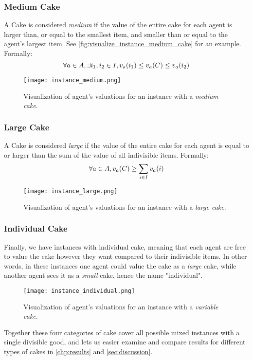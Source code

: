 \subsubsection*{Medium Cake}\label{subsubsec:medium-cake}
A Cake is considered \textit{medium} if the value of the entire cake for each agent is larger than, or equal to the smallest item, and smaller than or equal to the agent's largest item. See \autoref{fig:visualize_instance_medium_cake} for an example. Formally:
$$\forall a\in A, \exists i_1,i_2\in I, v_a(i_1)\leq v_a(C)\leq v_a(i_2)$$
\begin{figure}
    \centering
    \texttt{[image: instance\_medium.png]}
    \caption{Visualization of agent's valuations for an instance with a \textit{medium cake}.}
    \label{fig:visualize_instance_medium_cake}
\end{figure}

\subsubsection*{Large Cake}\label{subsubsec:large-cake}
A Cake is considered \textit{large} if the value of the entire cake for each agent is equal to or larger than the sum of the value of all indivisible items. Formally: 
$$\forall a\in A, v_a(C)\geq \sum_{i\in I}v_a(i)$$
\begin{figure}
    \centering
    \texttt{[image: instance\_large.png]}
    \caption{Visualization of agent's valuations for an instance with a \textit{large cake}.}
    \label{fig:visualize_instance_large_cake}
\end{figure}

\subsubsection{Individual Cake}\label{subsubsec:individual-cake}
Finally, we have instances with individual cake, meaning that each agent are free to value the cake however they want compared to their indivisible items. In other words, in these instances one agent could value the cake as a \textit{large} cake, while another agent sees it as a \textit{small} cake, hence the name "individual".
\begin{figure}
    \centering
    \texttt{[image: instance\_individual.png]}
    \caption{Visualization of agent's valuations for an instance with a \textit{variable cake}.}
    \label{fig:visualize_instance_variable_cake}
\end{figure}

Together these four categories of cake cover all possible mixed instances with a single divisible good, and lets us easier examine and compare results for different types of cakes in \autoref{chp:results} and \autoref{sec:discussion}.